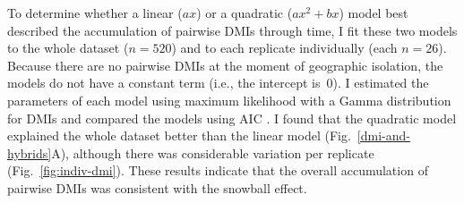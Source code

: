 \begin{doublespace}
To determine whether a linear ($ax$) or a quadratic ($ax^{2} + bx$) model
best described the accumulation of pairwise DMIs through time,
I fit these two models to the whole dataset ($n = 520$)
and to each replicate individually (each $n = 26$).
%
Because there are no pairwise DMIs at the moment of geographic isolation,
the models do not have a constant term (i.e., the intercept is~0).
%
I estimated the parameters of each model using maximum likelihood
with a Gamma distribution for DMIs and compared the models using AIC
\citep{bol08}.
%
I found that the quadratic model explained the whole dataset better
than the linear model (Fig.~\ref{dmi-and-hybrids}A),
although there was considerable variation per replicate
(Fig.~\ref{fig:indiv-dmi}).
%
These results indicate that the overall accumulation of pairwise DMIs
was consistent with the snowball effect.




\end{doublespace}
